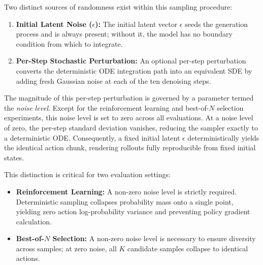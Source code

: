 \documentclass[a4paper,11pt]{report}
\begin{document}
Two distinct sources of randomness exist within this sampling procedure:
\begin{enumerate}
    \item \textbf{Initial Latent Noise ($\epsilon$):} The initial latent vector $\epsilon$ seeds the generation process and is always present; without it, the model has no boundary condition from which to integrate.
    \item \textbf{Per-Step Stochastic Perturbation:} An optional per-step perturbation converts the deterministic ODE integration path into an equivalent SDE by adding fresh Gaussian noise at each of the ten denoising steps. 
\end{enumerate}

The magnitude of this per-step perturbation is governed by a parameter termed the \emph{noise level}. Except for the reinforcement learning and best-of-$N$ selection experiments, this noise level is set to zero across all evaluations. At a noise level of zero, the per-step standard deviation vanishes, reducing the sampler exactly to a deterministic ODE. Consequently, a fixed initial latent $\epsilon$ deterministically yields the identical action chunk, rendering rollouts fully reproducible from fixed initial states.

This distinction is critical for two evaluation settings:
\begin{itemize}
    \item \textbf{Reinforcement Learning:} A non-zero noise level is strictly required. Deterministic sampling collapses probability mass onto a single point, yielding zero action log-probability variance and preventing policy gradient calculation.
    \item \textbf{Best-of-$N$ Selection:} A non-zero noise level is necessary to ensure diversity across samples; at zero noise, all $K$ candidate samples collapse to identical actions.
\end{itemize}
\end{document}

